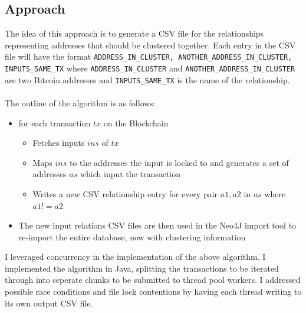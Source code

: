 \subsection{Approach}
The idea of this approach is to generate a CSV file for the relationships representing addresses that should be clustered together. Each entry in the CSV file will have the format \texttt{ADDRESS\_IN\_CLUSTER, ANOTHER\_ADDRESS\_IN\_CLUSTER, INPUTS\_SAME\_TX} where \texttt{ADDRESS\_IN\_CLUSTER} and \texttt{ANOTHER\_ADDRESS\_IN\_CLUSTER} are two Bitcoin addresses and \texttt{INPUTS\_SAME\_TX} is the name of the relationship. 
\\\\
The outline of the algorithm is as follows:
\begin{itemize}
    \item for each transaction $tx$ on the Blockchain
    \begin{itemize}
        \item Fetches inputs $ins$ of $tx$
        \item Maps $ins$ to the addresses the input is locked to and generates a set of addresses $as$ which input the transaction 
        \item Writes a new CSV relationship entry for every pair $a1, a2$ in $as$ where $a1 != a2$
    \end{itemize}
    \item The new input relations CSV files are then used in the Neo4J import tool to re-import the entire database, now with clustering information
\end{itemize}
I leveraged concurrency in the implementation of the above algorithm. I implemented the algorithm in Java, splitting the transactions to be iterated through into seperate chunks to be submitted to thread pool workers. I addressed possible race conditions and file lock contentions by having each thread writing to its own output CSV file.  

